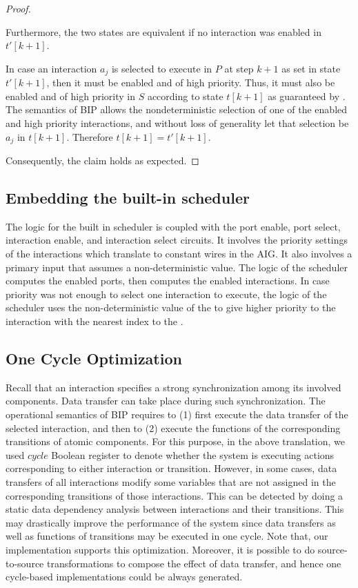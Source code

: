 \begin{proof}
\begin{itemize}
Furthermore, the two states are equivalent if no interaction 
was enabled in $t'[k+1]$. 

In case an interaction $a_j$ is selected to execute in $P$ 
at step $k+1$ as set in state $t'[k+1]$, 
then it must be enabled and of high priority.
Thus, it must also be enabled and of high priority in $S$ 
according to state $t[k+1]$
as guaranteed by . 
The semantics of BIP allows the nondeterministic selection of
one of the enabled and high priority interactions, 
and without loss of generality let that selection 
be $a_j$ in $t[k+1]$. 
Therefore $t[k+1]=t'[k+1]$. 
\end{itemize}
%
Consequently, the claim holds as expected. 
\end{proof}
%


\subsection{Embedding the built-in scheduler}
The logic for the built in scheduler is coupled with the 
port enable, port select, interaction enable, and interaction
select circuits. 
It involves the priority settings of the interactions which 
translate to constant wires in the AIG.
It also involves a  primary input that assumes 
a non-deterministic value. 
The logic of the scheduler computes the enabled ports, then 
computes the enabled interactions. 
In case priority was not enough to select one interaction to 
execute, the logic of the scheduler uses the non-deterministic
value of the  to give higher priority to the
interaction with the nearest index to the .



\subsection{One Cycle Optimization}
%
Recall that an interaction specifies a strong synchronization among its involved components.
Data transfer can take place during such synchronization.
The operational semantics of BIP requires to (1) first execute the data transfer of the selected interaction, and then to (2) execute the functions of the corresponding transitions of atomic components.
For this purpose, in the above translation, we used $\mathit{cycle}$ Boolean register to denote whether the system is executing actions corresponding to either interaction or transition.
However, in some cases, data transfers of all interactions modify some variables that are not assigned in the corresponding transitions of those interactions.
This can be detected by doing a static data dependency analysis
between interactions and their transitions. 
This may drastically improve the performance of the system since data transfers as well as functions of transitions may be executed in one cycle. Note that, our implementation supports this optimization. 
Moreover, it is possible to do source-to-source transformations to compose the effect of data transfer, and hence one cycle-based implementations could be always generated.
%
